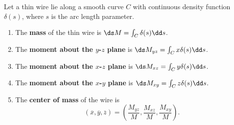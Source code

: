\begin{definition}\label{def:mass_of_thin_wire}%
Let a thin wire lie along a smooth curve $C$ with continuous density function $\delta(s)$, where $s$ is the arc length parameter. 	%
\begin{enumerate}
	\item The \textbf{mass} of the thin wire is $\ds M = \int_C \delta(s)\dd s$.
	\item	The \textbf{moment about the $y$-$z$ plane} is $\ds M_{yz} = \int_C x\delta(s)\dd s$.
	
	\item	The \textbf{moment about the $x$-$z$ plane} is $\ds M_{xz} = \int_C y\delta(s)\dd s$.
	\item	The \textbf{moment about the $x$-$y$ plane} is $\ds M_{xy} = \int_C z\delta(s)\dd s$.
	\item The \textbf{center of mass} of the wire is
	\[
	(\overline{x},\overline{y},\overline{z})
	= \left(\frac{M_{yz}}M, \frac{M_{xz}}M,\frac{M_{xy}}M\right).
	\]
\end{enumerate}
\end{definition}

